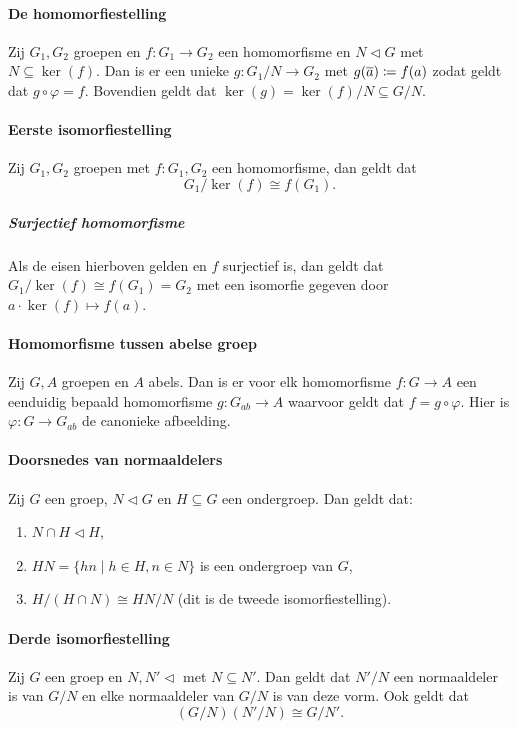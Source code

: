 \paragraph{De homomorfiestelling} Zij \(G_{1},G_{2}\) groepen en \(f\colon G_{1}\to G_{2}\) een homomorfisme en \(N\triangleleft G\) met \(N\subseteq\ker(f)\). Dan is er een unieke \(g\colon G_{1}/N\to G_{2}\) met \(g(\overline{a})\coloneqq f(a)\) zodat geldt dat \(g\circ\varphi=f\). Bovendien geldt dat \(\ker(g)=\ker(f)/N\subseteq G/N\).

\paragraph{Eerste isomorfiestelling} Zij \(G_{1},G_{2}\) groepen met \(f\colon G_{1},G_{2}\) een homomorfisme, dan geldt dat
\[
    G_{1}/\ker(f)\cong f(G_{1}).
\]

\subparagraph{Surjectief homomorfisme} Als de eisen hierboven gelden en \(f\) surjectief is, dan geldt dat \(G_{1}/\ker(f)\cong f(G_{1})=G_{2}\) met een isomorfie gegeven door \(a\cdot\ker(f)\mapsto f(a)\).

\paragraph{Homomorfisme tussen abelse groep} Zij \(G,A\) groepen en \(A\) abels. Dan is er voor elk homomorfisme \(f\colon G\to A\) een eenduidig bepaald homomorfisme \(g\colon G_{ab}\to A\) waarvoor geldt dat \(f=g\circ \varphi\). Hier is \(\varphi\colon G\to G_{ab}\) de canonieke afbeelding.

\paragraph{Doorsnedes van normaaldelers} Zij \(G\) een groep, \(N\triangleleft G\) en \(H\subseteq G\) een ondergroep. Dan geldt dat:
\begin{enumerate}
    \item \(N\cap H\triangleleft H\),
    \item \(HN=\{hn\mid h\in H,n\in N\}\) is een ondergroep van \(G\),
    \item \(H/(H\cap N)\cong HN/N\) (dit is de tweede isomorfiestelling).
\end{enumerate}

\paragraph{Derde isomorfiestelling} Zij \(G\) een groep en \(N,N'\triangleleft\) met \(N\subseteq N'\). Dan geldt dat \(N'/N\) een normaaldeler is van \(G/N\) en elke normaaldeler van \(G/N\) is van deze vorm. Ook geldt dat
\[
    (G/N)(N'/N)\cong G/N'.
\]